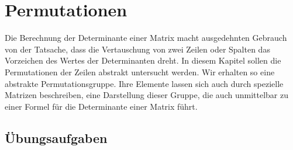 %
%
%
\chapter{Permutationen
\label{buch:chapter:permutationen}}
\rhead{}
Die Berechnung der Determinante einer Matrix macht ausgedehnten
%
Gebrauch von der Tatsache, dass die Vertauschung von zwei Zeilen
oder Spalten das Vorzeichen des Wertes der Determinanten dreht.
In diesem Kapitel sollen die Permutationen der Zeilen abstrakt
%
untersucht werden.
Wir erhalten so eine abstrakte Permutationsgruppe.
%
Ihre Elemente lassen sich auch durch spezielle Matrizen beschreiben,
eine Darstellung dieser Gruppe, die auch unmittelbar zu einer
%
Formel für die Determinante einer Matrix führt.






\section*{Übungsaufgaben}
\begin{uebungsaufgaben}
\end{uebungsaufgaben}


